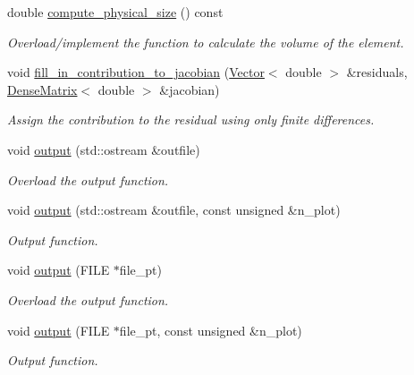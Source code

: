 \begin{DoxyCompactItemize}
double \hyperlink{classoomph_1_1AxisymmetricPVDEquations_ac4d790ab3df428eb178c247f0ff13c29}{compute\+\_\+physical\+\_\+size} () const
\begin{DoxyCompactList}\small\item\em Overload/implement the function to calculate the volume of the element. \end{DoxyCompactList}\item 
void \hyperlink{classoomph_1_1AxisymmetricPVDEquations_a80e76c7d645e8863f2dd5b1bf456516a}{fill\+\_\+in\+\_\+contribution\+\_\+to\+\_\+jacobian} (\hyperlink{classoomph_1_1Vector}{Vector}$<$ double $>$ \&residuals, \hyperlink{classoomph_1_1DenseMatrix}{Dense\+Matrix}$<$ double $>$ \&jacobian)
\begin{DoxyCompactList}\small\item\em Assign the contribution to the residual using only finite differences. \end{DoxyCompactList}\item 
void \hyperlink{classoomph_1_1AxisymmetricPVDEquations_a70c01efa665238ec7a574588209d3edb}{output} (std\+::ostream \&outfile)
\begin{DoxyCompactList}\small\item\em Overload the output function. \end{DoxyCompactList}\item 
void \hyperlink{classoomph_1_1AxisymmetricPVDEquations_a35cf174ca1692f817e3182166e22ef4b}{output} (std\+::ostream \&outfile, const unsigned \&n\+\_\+plot)
\begin{DoxyCompactList}\small\item\em Output function. \end{DoxyCompactList}\item 
void \hyperlink{classoomph_1_1AxisymmetricPVDEquations_a3b271e966cc554c21231503f7a965549}{output} (F\+I\+LE $\ast$file\+\_\+pt)
\begin{DoxyCompactList}\small\item\em Overload the output function. \end{DoxyCompactList}\item 
void \hyperlink{classoomph_1_1AxisymmetricPVDEquations_a780e6e426869eec81758bf7396a54bad}{output} (F\+I\+LE $\ast$file\+\_\+pt, const unsigned \&n\+\_\+plot)
\begin{DoxyCompactList}\small\item\em Output function. \end{DoxyCompactList}\end{DoxyCompactItemize}
